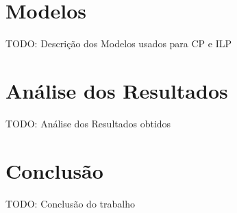 \documentclass[12pt,twoside]{report} %
\begin{document}
\chapter{Modelos}
\label{cap:model}
TODO: Descrição dos Modelos usados para CP e ILP
% 

\chapter{Análise dos Resultados}
\label{cap:resul}
TODO: Análise dos Resultados obtidos
% 

\chapter{Conclusão}
\label{cap:concl}
TODO: Conclusão do trabalho
% 


\appendix



% 
% 
% 
% 
% 
% 
% 
% 
% 
% 
% 
% 
% 
% 
% 
% 
% 
% 
% 
% 
% 
% 
% 
% 
% 
% 
% 
% 
% 
% 
% 
% 
% 



\end{document}
